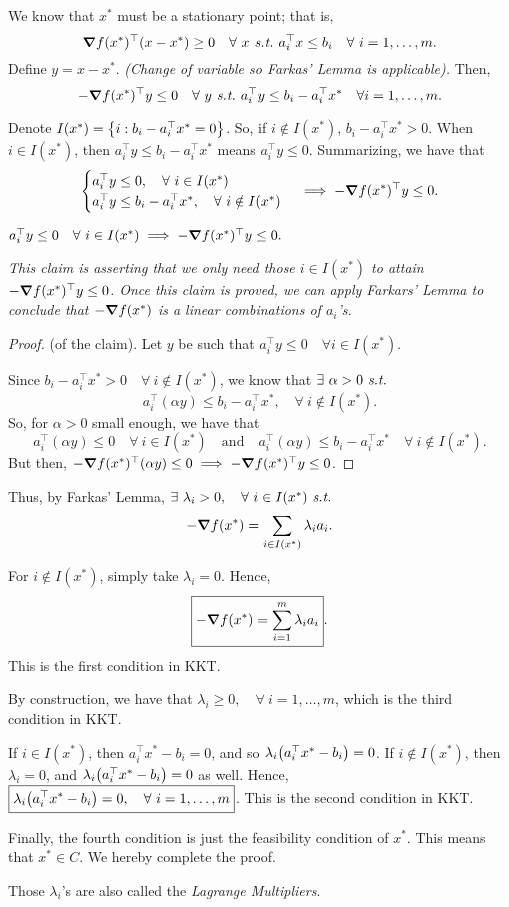 \begin{prf}
	We know that $x^*$ must be a stationary point; that is, \[\grad f(x^*)^\top(x-x^*)\geq0\quad\forall\ x\emph{\ s.t.\ } a_i^\top x\leq b_i\quad\forall\ i=1,\dots,m.\]	Define $y=x-x^*$. \textit{(Change of variable so Farkas' Lemma is applicable).} Then, \[-\grad f(x^*)^\top y\leq0\quad\forall\ y\emph{\ s.t.\ } a_i^\top y\leq b_i-a_i^\top x^*\quad\forall i=1,\dots,m.\]\par 
	Denote $I(x^*)=\qty{i:b_i-a_i^\top x^*=0}$. So, if $i\notin I(x^*)$, $b_i-a_i^\top x^*>0$. When $i\in I(x^*)$, then $a_i^\top y\leq b_i-a_i^\top x^*$ means $a_i^\top y\leq0$. Summarizing, we have that \[\begin{cases}a_i^\top y\leq0,\quad\forall\ i\in I(x^*)\\a_i^\top y\leq b_i-a_i^\top x^*,\quad\forall\ i\notin I(x^*)\end{cases}\implies-\grad f(x^*)^\top y\leq0.\]\par 
	\begin{framed}
	\begin{clm}
		$a_i^\top y\leq0\quad\forall\ i\in I(x^*)\implies-\grad f(x^*)^\top y\leq0.$
	\end{clm}
	\textit{This claim is asserting that we only need those $i\in I(x^*)$ to attain $-\grad f(x^*)^\top y\leq0$. Once this claim is proved, we can apply Farkars' Lemma to conclude that $-\grad f(x^*)$ is a linear combinations of $a_i$'s.}\par 
	\begin{proof} (of the claim).
		Let $y$ be such that $a_i^\top y\leq0\quad\forall i\in I(x^*)$.\par 
		 Since $b_i-a_i^\top x^*>0\quad\forall\ i\notin I(x^*)$, we know that $\exists\ \alpha>0\emph{\ s.t.\ }$ \[a_i^\top(\alpha y)\leq b_i-a_i^\top x^*,\quad\forall\ i\notin I(x^*).\] So, for $\alpha>0$ small enough, we have that \[a_i^\top(\alpha y)\leq0\quad\forall\ i\in I(x^*)\quad \text{and}\quad a_i^\top(\alpha y)\leq b_i-a_i^\top x^*\quad\forall\ i\notin I(x^*).\] But then, $-\grad f(x^*)^\top(\alpha y)\leq0\implies-\grad f(x^*)^\top y\leq0$. 
	\end{proof}
	\end{framed}
	Thus, by Farkas' Lemma, $\exists\ \lambda_i>0,\quad\forall\ i\in I(x^*)\st $ \[-\grad f(x^*)=\sum_{i\in I(x^*)}\lambda_ia_i.\]\par For $i\notin I(x^*)$, simply take $\lambda_i=0$. Hence, \[\boxed{-\grad f(x^*)=\sum_{i=1}^m\lambda_ia_i}.\] This is the first condition in KKT. \par 
	By construction, we have that $\boxed{\lambda_i\geq0,\quad\forall\ i=1,\dots,m}$, which is the third condition in KKT. \par 
	If $i\in I(x^*)$, then $a_i^\top x^*-b_i=0$, and so $\lambda_i\qty(a_i^\top x^*-b_i)=0$. If $i\notin I(x^*)$, then $\lambda_i=0$, and $\lambda_i\qty(a_i^\top x^*-b_i)=0$ as well. Hence, $\boxed{\lambda_i\qty(a_i^\top x^*-b_i)=0,\quad\forall\ i=1,\dots,m}$. This is the second condition in KKT.\par 
	Finally, the fourth condition is just the feasibility condition of $x^*$. This means that $x^*\in C$. We hereby complete the proof. 
\end{prf}
\begin{rmk}
	Those $\lambda_i$'s are also called the \emph{Lagrange Multipliers}.	
\end{rmk}





